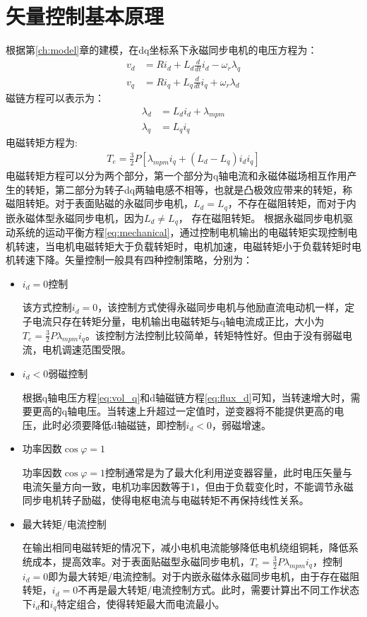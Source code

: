\section{矢量控制基本原理}
根据第\ref{ch:model}章的建模，在dq坐标系下永磁同步电机的电压方程为：
\begin{align}\label{eq:vdqFinal}
v_{d}&=Ri_{d}+L_{d}\frac{d}{dt}i_{d}-\omega_{r}\lambda_{q}\\
v_{q}&=Ri_{q}+L_{q}\frac{d}{dt}i_{q}+\omega_{r}\lambda_{d}\label{eq:vol_q}
\end{align}
磁链方程可以表示为：
\begin{align}
\lambda_{d}&=L_{d}i_{d}+\lambda_{mpm}\label{eq:flux_d}\\
\lambda_{q}&=L_{q}i_{q}
\end{align}
电磁转矩方程为:
\begin{align}
T_{e}=\frac{3}{2}P\left[\lambda_{mpm}i_{q}+(L_{d}-L_{q})i_{d}i_{q}\right]
\end{align}
电磁转矩方程可以分为两个部分，第一个部分为q轴电流和永磁体磁场相互作用产生的转矩，第二部分为转子dq两轴电感不相等，也就是凸极效应带来的转矩，称磁阻转矩。对于表面贴磁的永磁同步电机，$L_{d}=L_{q}$，不存在磁阻转矩，而对于内嵌永磁体型永磁同步电机，因为$L_{d}$$\neq$$L_{q}$， 存在磁阻转矩。
根据永磁同步电机驱动系统的运动平衡方程\ref{eq:mechanical}，通过控制电机输出的电磁转矩实现控制电机转速，当电机电磁转矩大于负载转矩时，电机加速，电磁转矩小于负载转矩时电机转速下降。矢量控制一般具有四种控制策略，分别为：
\begin{itemize}
	\item $i_{d}=0$控制
	
该方式控制$i_{d}=0$，该控制方式使得永磁同步电机与他励直流电动机一样，定子电流只存在转矩分量，电机输出电磁转矩与q轴电流成正比，大小为$T_{e}=\frac{3}{2}P\lambda_{mpm}i_{q}$。该控制方法控制比较简单，转矩特性好。但由于没有弱磁电流，电机调速范围受限。
	\item $i_{d}<0$弱磁控制
	
根据q轴电压方程\ref{eq:vol_q}和d轴磁链方程\ref{eq:flux_d}可知，当转速增大时，需要更高的q轴电压。当转速上升超过一定值时，逆变器将不能提供更高的电压，此时必须要降低d轴磁链，即控制$i_{d}<0$，弱磁增速。
	\item 功率因数$\cos{\varphi}=1$
	
功率因数$\cos{\varphi}=1$控制通常是为了最大化利用逆变器容量，此时电压矢量与电流矢量方向一致，电机功率因数等于1，但由于负载变化时，不能调节永磁同步电机转子励磁，使得电枢电流与电磁转矩不再保持线性关系。
	\item 最大转矩/电流控制
	
在输出相同电磁转矩的情况下，减小电机电流能够降低电机绕组铜耗，降低系统成本，提高效率。对于表面贴磁型永磁同步电机，$T_{e}=\frac{3}{2}P\lambda_{mpm}i_{q}$，控制$i_{d}=0$即为最大转矩/电流控制。对于内嵌永磁体永磁同步电机，由于存在磁阻转矩，$i_{d}=0$不再是最大转矩/电流控制方式。此时，需要计算出不同工作状态下$i_{d}$和$i_{q}$特定组合，使得转矩最大而电流最小\cite{mtpa_2011,lee_mtpa_2010,huang2010maximum}。	
\end{itemize}

